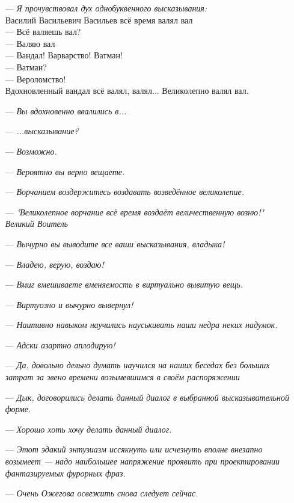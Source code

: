 \begin{itemize}
    \item[---] \emph{Я прочувствовал дух однобуквенного высказывания:}\\
    Василий Васильевич Васильев всё время валял вал\\
  --- Всё валяешь вал?\\
  --- Валяю вал\\
  --- Вандал! Варварство! Ватман!\\
  --- Ватман?\\
  --- Вероломство!\\
  Вдохновленный вандал всё валял, валял... Великолепно валял вал.
  \item[---] \emph{Вы вдохновенно ввалились в...}
  \item[---] \emph{...высказывание?}
  \item[---] \emph{Возможно.}
  \item[---] \emph{Вероятно вы верно вещаете.}
  \item[---] \emph{Ворчанием воздержитесь воздавать возведённое великолепие.}
  \item[---] \emph{"Великолепное ворчание всё время воздаёт величественную возню!"\\
Великий Воитель}
  \item[---] \emph{Вычурно вы выводите все ваши высказывания, владыка!}
  \item[---] \emph{Владею, верую, воздаю!}
   \item[---] \emph{Вмиг вмешиваете вменяемость в виртуально вывитую вещь.}
  \item[---] \emph{Виртуозно и вычурно вывернул!}
  \item[---] \emph{Наитивно навыком научились науськивать наши недра неких надумок.}
  \item[---] \emph{Адски азартно аплодирую!}
  \item[---] \emph{Да, довольно дельно думать научился на наших беседах без больших затрат за звено времени возымевшимся в своём распоряжении}
  \item[---] \emph{Дык, договорились делать данный диалог в выбранной высказывательной форме.}
  \item[---] \emph{Хорошо хоть хочу делать данный диалог.}
  \item[---] \emph{Этот эдакий энтузиазм иссякнуть или исчезнуть вполне внезапно возымеет ---
  надо наибольшее напряжение проявить при проектировании фантазируемых фурорных фраз.}
  \item[---] \emph{Очень Ожегова освежить снова следует сейчас. 
}
\end{itemize}
